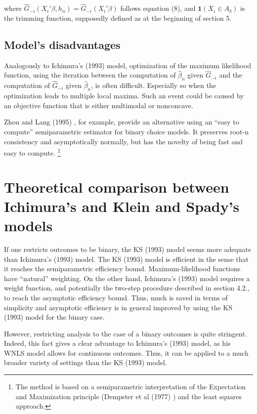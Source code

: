 \documentclass[a4paper]{article}
\begin{document}
where $\hat{G}_{-i}(X_i'\beta, h_n) = \hat{G}_{-i}(X_i'\beta)$ follows equation (8), and $\mathbf{1}{(X_i \in A_\delta)}$ is the trimming function, supposedly defined as at the beginning of section 5.

\subsection{Model's disadvantages} %
\label{sub:Model's disadvantages}
Analogously to Ichimura's (1993) \cite{[6]} model, optimization of the maximum likelihood function, using the iteration between the computation of $\hat{\beta}_n$ given $\hat{G}_{-i}$ and the computation of $\hat{G}_{-i}$ given $\hat{\beta}_n$, is often difficult.  Especially so when the optimization leads to multiple local maxima. Such an event could be caused by an objective function that is either multimodal or nonconcave. 

Zhou and Lang (1995) \cite{[26]}, for example, provide an alternative using an ``easy to compute'' semiparametric estimator for binary choice models. It preserves root-n consistency and asymptotically normally, but has the novelty of being fast and easy to compute. \footnote{The method is based on a semiparametric interpretation of the Expectation and Maximization principle (Dempster et al (1977) \cite{[27]}) and the least squares approach.}

\section{Theoretical comparison between Ichimura's and Klein and Spady's models} %
\label{sec:Theoretical comparison between Ichimura's and Klein and Spady's models}
If one restricts outcomes to be binary, the KS (1993) \cite{[12]} model seems more adequate than Ichimura's (1993) \cite{[6]} model. The KS (1993) \cite{[12]} model is efficient in the sense that it reaches the semiparametric efficiency bound. Maximum-likelihood functions have ``natural'' weighting. On the other hand, Ichimura's (1993) \cite{[6]} model requires a weight function, and potentially the two-step procedure described in section 4.2., to reach the asymptotic efficiency bound. Thus, much is saved in terms of simplicity and asymptotic efficiency is in general improved by using the KS (1993) \cite{[12]} model for the binary case.

However, restricting analysis to the case of a binary outcomes is quite stringent. Indeed, this fact gives a clear advantage to Ichimura's (1993) \cite{[6]} model, as his WNLS model allows for continuous outcomes. Thus, it can be applied to a much broader variety of settings than the KS (1993) \cite{[12]}  model.
\end{document}
